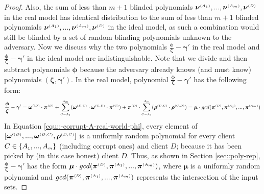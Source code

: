 \begin{proof}
Also, the sum of less than $m+1$ blinded polynomials ${\bm\nu}^{\scriptscriptstyle (A_{\scriptscriptstyle 1})},...,{\bm\nu}^{\scriptscriptstyle (A_{\scriptscriptstyle m})}, \bm\nu^{ \scriptscriptstyle {  {(D)}}}$   in the real model has identical distribution to the sum of less than $m+1$ blinded polynomials $ {\bm\nu}^{\scriptscriptstyle (A_{\scriptscriptstyle 1})},...,  {\bm\nu}^{\scriptscriptstyle (A_{\scriptscriptstyle m})},  {\bm\nu}^{ \scriptscriptstyle {  {(D)}}}$ in the ideal model, as such a combination would still be blinded by a set of random blinding polynomials unknown to the adversary. Now we discuss why the two polynomials $\frac{\bm\phi}{\bm\zeta}- \bm\gamma'$ in the real model and $\frac{ {\bm\phi}} { {\bm\zeta}}-  {\bm\gamma'}$ in the ideal model are indistinguishable. Note that we divide and then subtract  polynomials ${\bm\phi}$ because the adversary already knows (and must know) polynomials $(\bm\zeta, \bm\gamma')$. In the real model, polynomial $\frac{\bm\phi}{\bm\zeta}- \bm\gamma'$ has the following form: 
%
\begin{equation}\label{equ::-corrupt-A-real-world-phi}
%
 \frac{\bm\phi}{\bm\zeta}- \bm\gamma'=  \bm\omega'^{ \st {  {(D)}}}\cdot \bm\pi^{ \st {  {(D)}} } +\sum\limits^{ \st {   A}_{ \st {   m}}}_{ \st {  {C }= }  \st {   A}_{ \st {  1}}}(\bm\omega^{ \st {  {(D,C)}}} \cdot \bm\omega^{ \st {  {(C,D)}}}\cdot \bm\pi^{ \st {  (C)}}) +\bm\pi^{ \st {  {(D)}}}\cdot\sum\limits^{ \st {   A}_{ \st {   m}}}_{ \st {  {C }= }  \st {   A}_{ \st {  1}}}(\bm\rho^{ \st {  {(D,C)}}} \cdot \bm\rho^{ \st {  {(C,D)}}})=\bm\mu\cdot gcd( \bm\pi^{ \st {  {(D)}} },\bm\pi^{\st (A_1)}, ..., \bm\pi^{\st (A_m)})
\end{equation}
In Equation \ref{equ::-corrupt-A-real-world-phi}, every element of   $[\bm\omega'^{ \scriptscriptstyle {  {(D)}}},..., \bm\omega^{ \scriptscriptstyle {  {(D,C)}}}, \bm\rho^{ \scriptscriptstyle {  {(D,C)}}}]$ is a uniformly random polynomial for every  client $C\in \{  {  A}_{ \scriptscriptstyle {   1}}, ...,   {  A}_{ \scriptscriptstyle {   m}}\}$  (including corrupt ones) and client $D$; because it has been picked by (in this case honest) client $D$. Thus,  as shown in Section \ref{sec::poly-rep}, $\frac{\bm\phi}{\bm\zeta}- \bm\gamma'$ has the form $\bm\mu\cdot gcd( \bm\pi^{ \scriptscriptstyle {  {(D)}} },\bm\pi^{\scriptscriptstyle (A_1)}, ..., \bm\pi^{\scriptscriptstyle (A_m)})$, where $\bm\mu$ is a uniformly random polynomial and $gcd( \bm\pi^{ \scriptscriptstyle {  {(D)}} },\bm\pi^{\scriptscriptstyle (A_1)}, ..., \bm\pi^{\scriptscriptstyle (A_m)})$ represents the intersection of the input sets. 


\end{proof}
